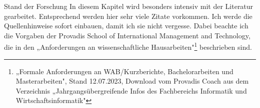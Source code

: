 \begin{section}{Stand der Forschung}
In diesem Kapitel wird besonders intensiv mit der Literatur gearbeitet. Entsprechend werden hier sehr viele Zitate vorkommen. Ich werde die Quellenhinweise sofort einbauen, damit ich sie nicht vergesse.
Dabei beachte ich die Vorgaben der Provadis School of International Management and Technology, die in den „Anforderungen an wissenschaftliche Hausarbeiten"\footnote{„Formale Anforderungen an WAB/Kurzberichte, Bachelorarbeiten und Masterarbeiten", Stand 12.07.2023, Download vom Provadis Coach aus dem Verzeichnis „Jahrgangsübergreifende Infos des Fachbereichs Informatik und Wirtschaftsinformatik"} beschrieben sind.
\end{section}
